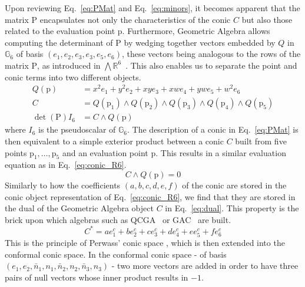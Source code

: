 \documentclass{birkjour}
\begin{document}
Upon reviewing Eq.~\eqref{eq:PMat} and Eq.~\eqref{eq:minors}, it becomes apparent that the matrix \(\mathrm{P}\) encapsulates not only the characteristics of the conic \(C\) but also those related to the evaluation point \(\mathrm{p}\).
Furthermore, Geometric Algebra allows computing the determinant of \(\mathrm{P}\) by wedging together vectors embedded by \(Q\) in \(\mathbb{G}_6\) of basis \((e_1, e_2, e_3, e_3, e_5, e_6)\), these vectors being analogous to the rows of the matrix \(\mathrm{P}\), as introduced in \(\bigwedge \mathbb{R}^6\)~\cite{a_kirillov_elements_1974,perwass_geometric_2009}. This also enables us to separate the point and conic terms into two different objects.
\begin{align}
Q(\mathrm{p}) &= x^2 e_1 + y^2 e_2 + xy e_3 + xw e_4 + yw e_5 + w^2 e_6 \\
C &= Q(\mathrm{p}_1) \wedge Q(\mathrm{p}_2) \wedge Q(\mathrm{p}_3) \wedge Q(\mathrm{p}_4) \wedge Q(\mathrm{p}_5) \\
\det(\mathrm{P}) I_6 &= C \wedge Q(\mathrm{p})
\end{align}
where \(I_6\) is the pseudoscalar of \(\mathbb{G}_6\).
The description of a conic in Eq.~\eqref{eq:PMat} is then equivalent to a simple exterior product between a conic \(C\) built from five points \(\mathrm{p}_1,\dots,\mathrm{p}_5\) and an evaluation point \(\mathrm{p}\). This results in a similar evaluation equation as in Eq.~\eqref{eq:conic_R6}.
\begin{equation}
C \wedge Q(\mathrm{p}) = 0
\end{equation}
Similarly to how the coefficients \((a,b,c,d,e,f)\) of the conic are stored in the conic object representation of Eq.~\eqref{eq:conic_R6}, we find that they are stored in the dual of the Geometric Algebra object \(C\) in Eq.~\eqref{eq:dual}. This property is the brick upon which algebras such as QCGA~\cite{breuils_three-dimensional_2019} or GAC~\cite{hrdina_geometric_2018} are built.
\begin{equation}\label{eq:dual}
    C^* = a e_1^c + b e_2^c + c e_3^c + d e_4^c + e e_5^c + f e_6^c
\end{equation}
This is the principle of Perwass' conic space \cite{perwass_geometric_2009}, which is then extended into the conformal conic space. In the conformal conic space - of basis \\\(\left(e_1,e_2,\bar n_1, n_1,\bar n_2, n_2,\bar n_3, n_3\right)\) - two more vectors are added in order to have three pairs of null vectors whose inner product results in \(-1\).
\end{document}
